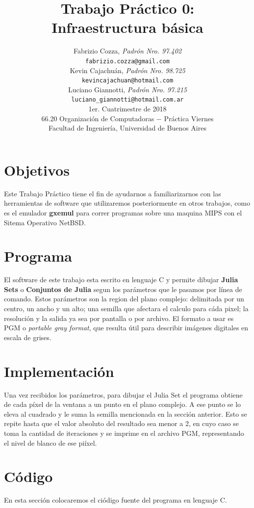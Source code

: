 \documentclass[a4paper,10pt]{article}
\title{		\textbf{Trabajo Pr\'{a}ctico 0: \\
			Infraestructura b\'{a}sica
			}}
\author{	Fabrizio Cozza, \textit{Padr\'{o}n Nro. 97.402}                     \\
            \texttt{ fabrizio.cozza@gmail.com }                                              \\[2.5ex]
            Kevin Cajachu\'{a}n, \textit{Padr\'{o}n Nro. 98.725}                     \\
            \texttt{ kevincajachuan@hotmail.com }                                              \\[2.5ex]
            Luciano Giannotti, \textit{Padr\'{o}n Nro. 97.215}                     \\
            \texttt{luciano\_giannotti@hotmail.com.ar}                                              \\[3.5ex]
	 \newline
            \normalsize{1er. Cuatrimestre de 2018}                                      \\
            \normalsize{66.20 Organizaci\'{o}n de Computadoras  $-$ Pr\'{a}ctica Viernes}  \\
            \normalsize{Facultad de Ingenier\'{i}a, Universidad de Buenos Aires}            \\
       }
\date{}
\begin{document}
\maketitle
\thispagestyle{empty}   %


\section{Objetivos}

Este Trabajo Pr\'{a}ctico tiene el fin de ayudarnos a familiarizarnos con las herramientas de software que utilizaremos posteriormente en otros trabajos, como es el emulador \textbf{gxemul} para correr programas sobre una maquina MIPS con el Sitema Operativo NetBSD.


\section{Programa}

El software de este trabajo esta escrito en lenguaje C y permite dibujar \textbf{Julia Sets} o \textbf{Conjuntos de Julia} segun los par\'{a}metros que le pasamos por l\'{i}nea de comando.
Estos parámetros son la region del plano complejo: delimitada por un centro, un ancho y un alto; una semilla que afectara el calculo para c\'{a}da pixel; la resoluci\'{o}n y la salida ya sea por pantalla o por archivo.
El formato a usar es  PGM o \textit{portable gray format}, que resulta \'{u}til para describir im\'{a}genes digitales en escala de grises.


\section{Implementaci\'{o}n}

Una vez recibidos los par\'{a}metros, para dibujar el Julia Set el programa obtiene de cada p\'{i}xel de la ventana a un punto en el plano complejo.
A ese punto se lo eleva al cuadrado y le suma la semilla mencionada en la secci\'{o}n anterior. Esto se repite hasta que el valor absoluto del resultado sea menor a 2, en cuyo caso se toma la cantidad de iteraciones y se imprime en el archivo PGM, representando el nivel de blanco de ese pi\'{i}xel.


\section{C\'{o}digo}

En esta secci\'{o}n colocaremos el ci\'{o}digo fuente del programa en lenguaje C.
\end{document}
